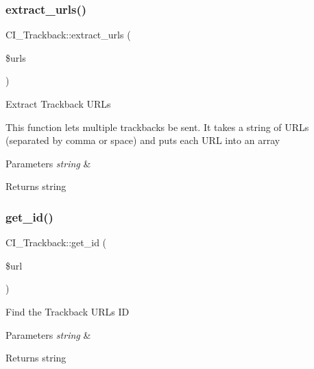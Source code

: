 \subsubsection{\texorpdfstring{extract\+\_\+urls()}{extract\_urls()}}
{\footnotesize\ttfamily C\+I\+\_\+\+Trackback\+::extract\+\_\+urls (\begin{DoxyParamCaption}\item[{}]{\$urls }\end{DoxyParamCaption})}

Extract Trackback U\+R\+Ls

This function lets multiple trackbacks be sent. It takes a string of U\+R\+Ls (separated by comma or space) and puts each U\+RL into an array


\begin{DoxyParams}{Parameters}
{\em string} & \\
\hline
\end{DoxyParams}
\begin{DoxyReturn}{Returns}
string 
\end{DoxyReturn}
\mbox{\label{class_c_i___trackback_a92abcd341c9d8e143540d3d76a8a5ced}} 
\subsubsection{\texorpdfstring{get\+\_\+id()}{get\_id()}}
{\footnotesize\ttfamily C\+I\+\_\+\+Trackback\+::get\+\_\+id (\begin{DoxyParamCaption}\item[{}]{\$url }\end{DoxyParamCaption})}

Find the Trackback U\+RL\textquotesingle{}s ID


\begin{DoxyParams}{Parameters}
{\em string} & \\
\hline
\end{DoxyParams}
\begin{DoxyReturn}{Returns}
string 
\end{DoxyReturn}
\mbox{\label{class_c_i___trackback_a515f9cb8b2ad73e74a8b3e37cc38061b}} 
